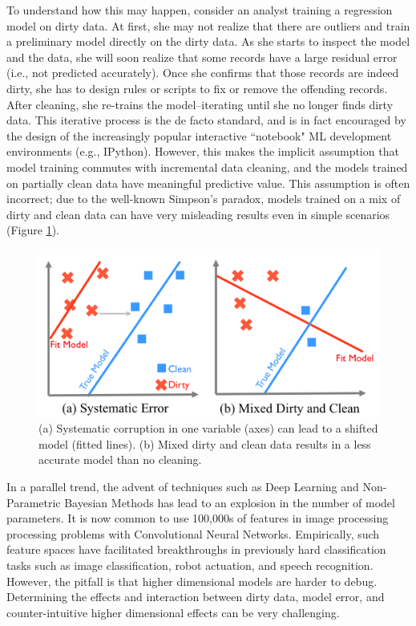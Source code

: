 To understand how this may happen, consider an analyst training a regression model on dirty data. 
At first, she may not realize that there are outliers and train a preliminary model directly on the dirty data. 
As she starts to inspect the model and the data, she will soon realize that some records have a large residual error (i.e., not predicted accurately). 
Once she confirms that those records are indeed dirty, she has to design rules or scripts to fix or remove the offending records. 
After cleaning, she re-trains the model--iterating until she no longer finds dirty data.
This iterative process is the de facto standard, and is in fact encouraged by the design of the increasingly popular interactive ``notebook" ML development environments (e.g., IPython).
However, this makes the implicit assumption that model training commutes with incremental data cleaning, and the models trained on partially clean data have meaningful predictive value.
This assumption is often incorrect; due to the well-known Simpson's paradox, models trained on a mix of dirty and clean data can have very misleading results even in simple scenarios (Figure \ref{update-arch1}).

\begin{figure}[t]
\centering
 \includegraphics[width=0.8\columnwidth]{figs/update-arch.png}
 \caption{(a) Systematic corruption in one variable (axes) can lead to a shifted model (fitted lines). 
 (b) Mixed dirty and clean data results in a less accurate model than no cleaning.\label{update-arch1}}\vspace{-2em}
\end{figure}

In a parallel trend, the advent of techniques such as Deep Learning and Non-Parametric Bayesian Methods has lead to an explosion in the number of model parameters.
It is now common to use 100,000s of features in image processing processing problems with Convolutional Neural Networks.
Empirically, such feature spaces have facilitated breakthroughs in previously hard classification tasks such as image classification, robot actuation, and speech recognition.
However, the pitfall is that higher dimensional models are harder to debug.
Determining the effects and interaction between dirty data, model error, and counter-intuitive higher dimensional effects can be very challenging.

